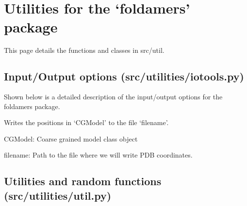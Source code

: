 \documentclass[letterpaper,12pt,english,openany,twoside]{sphinxmanual}
\begin{document}
\chapter{Utilities for the ‘foldamers’ package}
\label{\detokenize{util:utilities-for-the-foldamers-package}}\label{\detokenize{util::doc}}
This page details the functions and classes in src/util.


\section{Input/Output options (src/utilities/iotools.py)}
\label{\detokenize{util:input-output-options-src-utilities-iotools-py}}
Shown below is a detailed description of the input/output
options for the foldamers package.

\label{\detokenize{util:module-iotools}}

\begin{fulllineitems}
\label{\detokenize{util:iotools.write_pdbfile}}
Writes the positions in ‘CGModel’ to the file ‘filename’.

CGModel: Coarse grained model class object

filename: Path to the file where we will write PDB coordinates.

\end{fulllineitems}



\section{Utilities and random functions (src/utilities/util.py)}
\label{\detokenize{util:module-util}}\label{\detokenize{util:utilities-and-random-functions-src-utilities-util-py}}
\end{document}
